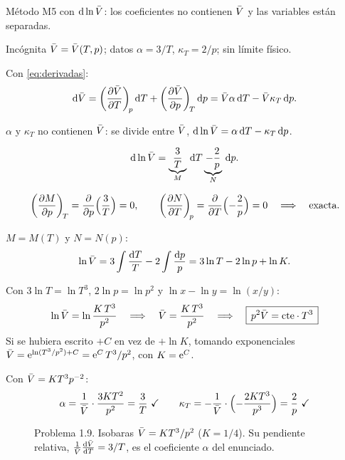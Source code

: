 \begin{resolucion}
\idea Método M5 con $\mathrm{d}\ln\bar{V}$: los coeficientes no contienen $\bar{V}$ y las variables están separadas.

 Incógnita $\bar{V}=\bar{V}(T,p)$; datos $\alpha=3/T$, $\kappa_T=2/p$; sin límite físico.

 Con \eqref{eq:derivadas}:
\[
  \mathrm{d}\bar{V}=\left(\frac{\partial \bar{V}}{\partial T}\right)_{\!p}\mathrm{d} T+\left(\frac{\partial \bar{V}}{\partial p}\right)_{\!T}\mathrm{d} p=\bar{V}\alpha\,\mathrm{d} T-\bar{V}\kappa_T\,\mathrm{d} p.
\]

 $\alpha$ y $\kappa_T$ no contienen $\bar{V}$: se divide entre $\bar{V}$,
$\mathrm{d}\ln\bar{V}=\alpha\,\mathrm{d} T-\kappa_T\,\mathrm{d} p$.

\[
  \mathrm{d}\ln\bar{V}=\underbrace{\frac{3}{T}}_{M}\,\mathrm{d} T\underbrace{-\frac{2}{p}}_{N}\,\mathrm{d} p.
\]

\[
  \left(\frac{\partial M}{\partial p}\right)_{\!T}=\frac{\partial}{\partial p}\Bigl(\frac3T\Bigr)=0,\qquad
  \left(\frac{\partial N}{\partial T}\right)_{\!p}=\frac{\partial}{\partial T}\Bigl(-\frac2p\Bigr)=0\quad\Longrightarrow\quad\text{exacta.}
\]

 $M=M(T)$ y $N=N(p)$:
\[
  \ln\bar{V}=3\int\frac{\mathrm{d} T}{T}-2\int\frac{\mathrm{d} p}{p}=3\ln T-2\ln p+\ln K.
\]

 Con $3\ln T=\ln T^3$, $2\ln p=\ln p^2$ y $\ln x-\ln y=\ln(x/y)$:
\[
  \ln\bar{V}=\ln\frac{K\,T^3}{p^2}\quad\Longrightarrow\quad\bar{V}=\frac{K\,T^3}{p^2}\quad\Longrightarrow\quad
  \boxed{\,p^2\bar{V}=\mathrm{cte}\cdot T^3\,}
\]
Si se hubiera escrito $+C$ en vez de $+\ln K$, tomando exponenciales
$\bar{V}=\mathrm{e}^{\ln(T^3/p^2)+C}=\mathrm{e}^{C}\,T^3/p^2$, con $K=\mathrm{e}^C$.

 Con $\bar{V}=KT^3p^{-2}$:
\[
  \alpha=\frac1{\bar{V}}\cdot\frac{3KT^2}{p^2}=\frac3T\ \checkmark\qquad
  \kappa_T=-\frac1{\bar{V}}\cdot\Bigl(-\frac{2KT^3}{p^3}\Bigr)=\frac2p\ \checkmark
\]
\end{resolucion}

\begin{figure}[htbp]
\centering
{}
\caption{Problema 1.9. Isobaras $\bar{V}=KT^3/p^2$ ($K=1/4$). Su pendiente relativa,
$\frac1{\bar{V}}\frac{\mathrm{d}\bar{V}}{\mathrm{d} T}=3/T$, es el coeficiente $\alpha$ del enunciado.}
\label{fig:p19}
\end{figure}

